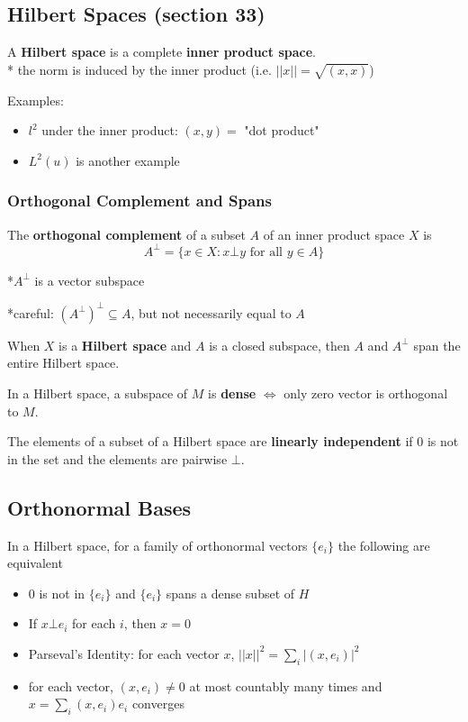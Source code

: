 \documentclass[a4paper, 12pt]{article}
\newcommand{\bt}[1]{\textbf{#1}} %
\newcommand{\gray}[1]{{\leavevmode\color[gray]{0.5}{#1}}} %
\begin{document}
\begin{multicols}{2}
\subsection{Hilbert Spaces (section 33)}

A \bt{Hilbert space} is a complete \bt{inner product space}.  \\
* the norm is induced by the inner product (i.e. $|| x || = \sqrt{(x, x)}$)

Examples: 
\begin{itemize}
    \item $l^2$ under the inner product: $(x, y) = $ "dot product"
    \item $L^2(u)$ is another example
\end{itemize}

\subsubsection{Orthogonal Complement and Spans}
The \bt{orthogonal complement} of a subset $A$  of an inner product space $X$ is 
$$A^\bot = \{x \in X: x \bot y \text{ for all } y \in A\}$$
\gray{"set of vector orthogonal to all vectors in A"}

*$A^\bot$ is a vector subspace 

*careful: $(A^\bot)^\bot \subseteq A$, but not necessarily equal to $A$

When $X$ is a \bt{Hilbert space} and $A$ is a closed subspace, 
then $A$ and $A^\bot$ span the entire Hilbert space.\\
\gray{in this case, we have $(A^\bot)^\bot = A$}

In a Hilbert space, a subspace of $M$ is \bt{dense} $\iff$
only zero vector is orthogonal to $M$.

The elements of a subset of a Hilbert space are \bt{linearly independent} if $0$ is not in the set and the 
elements are pairwise $\bot$.

\subsection{Orthonormal Bases}

In a Hilbert space, for a family of orthonormal vectors $\{e_i\}$ 
the following are equivalent
\begin{itemize}
    \item $0$ is not in $\{e_i\}$ and $\{e_i\}$ spans a dense subset of $H$
    \item If $x \bot e_i$ for each $i$, then $x = 0$
    \item Parseval's Identity: for each vector $x$, $|| x ||^2 = \sum_i |(x, e_i)|^2$
    \item for each vector, $(x, e_i) \neq 0$ at most countably many times and 
    $x = \sum_i (x, e_i)e_i$ converges
\end{itemize}


\end{multicols}
\end{document}

